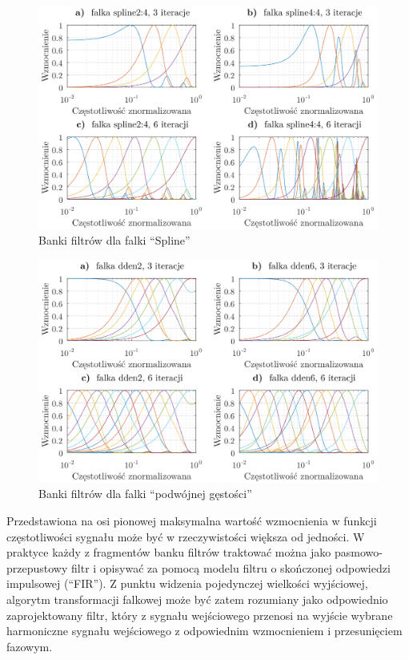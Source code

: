\begin{figure}[htb!]
\begin{center}
\includegraphics{obrazki/bank_spline_demo}
\caption{Banki filtrów dla falki \enquote{Spline} \label{fig_demo_spline}}
\end{center}
\end{figure}

\begin{figure}[htb!]
\begin{center}
\includegraphics{obrazki/bank_dden_demo}
\caption{Banki filtrów dla falki \enquote{podwójnej gęstości} \label{fig_demo_dden}}
\end{center}
\end{figure}

Przedstawiona na osi pionowej maksymalna wartość wzmocnienia w funkcji częstotliwości sygnału może być w rzeczywistości większa od jedności. W praktyce każdy z fragmentów banku filtrów traktować można jako pasmowo-przepustowy filtr i opisywać za pomocą modelu filtru o skończonej odpowiedzi impulsowej (\enquote{FIR}). Z punktu widzenia pojedynczej wielkości wyjściowej, algorytm transformacji falkowej może być zatem rozumiany jako odpowiednio zaprojektowany filtr, który z sygnału wejściowego przenosi na wyjście wybrane harmoniczne sygnału wejściowego z odpowiednim wzmocnieniem i przesunięciem fazowym.

